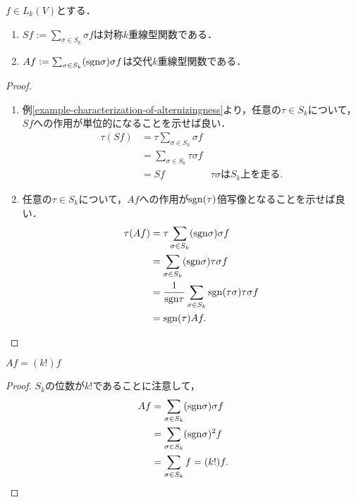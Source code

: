 \documentclass[uplatex,dvipdfmx]{jsreport}
\begin{document}
\begin{proposition}\mbox{}\label{prop-alternizer}
    $f\in L_k(V)$とする．
    \begin{enumerate}
        \item $Sf:=\sum_{\sigma\in S_k}\sigma f$は対称$k$重線型関数である．
        \item $Af:=\sum_{\sigma\in S_k}(\mathrm{sgn} \sigma)\sigma f$は交代$k$重線型関数である．
    \end{enumerate}
\end{proposition}
\begin{proof}\mbox{}
    \begin{enumerate}
        \item 例\ref{example-characterization-of-alternizingness}より，任意の$\tau\in S_k$について，$Sf$への作用が単位的になることを示せば良い．
        \begin{align*}
            \tau(Sf)&=\tau\sum_{\sigma\in S_k}\sigma f\\
            &=\sum_{\sigma\in S_k}\tau\sigma f\\
            &=Sf&\tau\sigma はS_k上を走る.
        \end{align*}
        \item 任意の$\tau\in S_k$について，$Af$への作用が$\mathrm{sgn}(\tau)$倍写像となることを示せば良い．
        \begin{align*}
            \tau(Af)&=\tau\sum_{\sigma\in S_k}(\mathrm{sgn}\sigma)\sigma f\\
            &=\sum_{\sigma\in S_k}(\mathrm{sgn}\sigma)\tau\sigma f\\
            &=\frac{1}{\mathrm{sgn}\tau}\sum_{\sigma\in S_k}\mathrm{sgn}(\tau\sigma)\tau\sigma f\\
            &=\mathrm{sgn}(\tau)Af.
        \end{align*}
    \end{enumerate}
\end{proof}

\begin{proposition}[交代重線型写像への交代化作用素の作用]
    $Af=(k!)f$
\end{proposition}
\begin{proof}
    $S_k$の位数が$k!$であることに注意して，
    \begin{align*}
        Af&=\sum_{\sigma\in S_k}(\mathrm{sgn}\sigma)\sigma f\\
        &=\sum_{\sigma\in S_k}(\mathrm{sgn}\sigma)^2f\\
        &=\sum_{\sigma\in S_k}f=(k!)f.
    \end{align*}
\end{proof}
\end{document}
